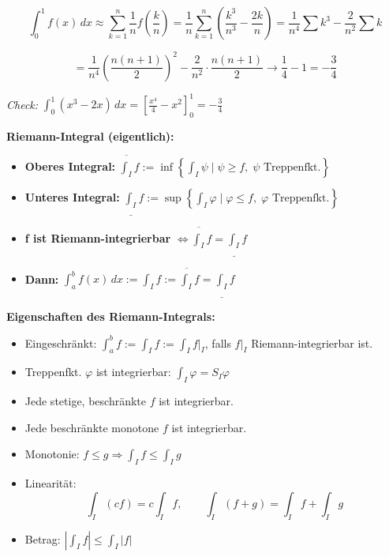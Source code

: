 \begin{itemize}
\[
\int_0^1 f(x)\,dx \approx \sum_{k=1}^n \frac{1}{n} f\left(\frac{k}{n}\right)
= \frac{1}{n} \sum_{k=1}^n \left( \frac{k^3}{n^3} - \frac{2k}{n} \right)
= \frac{1}{n^4} \sum k^3 - \frac{2}{n^2} \sum k
\]

\[
= \frac{1}{n^4} \left( \frac{n(n+1)}{2} \right)^2 - \frac{2}{n^2} \cdot \frac{n(n+1)}{2}
\to \frac{1}{4} - 1 = -\frac{3}{4}
\]

\textit{Check:}  
\( \int_0^1 (x^3 - 2x)\,dx = \left[ \frac{x^4}{4} - x^2 \right]_0^1 = -\frac{3}{4} \)

\textbf{Riemann-Integral (eigentlich):}
\begin{itemize}
  \item \textbf{Oberes Integral:} 
    \( \overline{\int_I} f := \inf \left\{ \int_I \psi \mid \psi \ge f,\; \psi \text{ Treppenfkt.} \right\} \)
  \item \textbf{Unteres Integral:} 
    \( \underline{\int_I} f := \sup \left\{ \int_I \varphi \mid \varphi \le f,\; \varphi \text{ Treppenfkt.} \right\} \)
  \item \textbf{f ist Riemann-integrierbar} \( \Leftrightarrow \overline{\int_I} f = \underline{\int_I} f \)
  \item \textbf{Dann:} \( \int_a^b f(x)\,dx := \int_I f := \overline{\int_I} f = \underline{\int_I} f \)
\end{itemize}

\textbf{Eigenschaften des Riemann-Integrals:}
\begin{itemize}
  \item Eingeschränkt: \( \int_a^b f := \int_I f := \int_I f|_I \), falls \( f|_I \) Riemann-integrierbar ist.

  \item Treppenfkt. \( \varphi \) ist integrierbar: \( \int_I \varphi = S_I \varphi \)

  \item Jede stetige, beschränkte \( f \) ist integrierbar.

  \item Jede beschränkte monotone \( f \) ist integrierbar.

  \item Monotonie: \( f \le g \Rightarrow \int_I f \le \int_I g \)

  \item Linearität:
  \[
    \int_I (cf) = c \int_I f, \qquad \int_I (f+g) = \int_I f + \int_I g
  \]

  \item Betrag: \( \left| \int_I f \right| \le \int_I |f| \)


\end{itemize}
\end{itemize}
